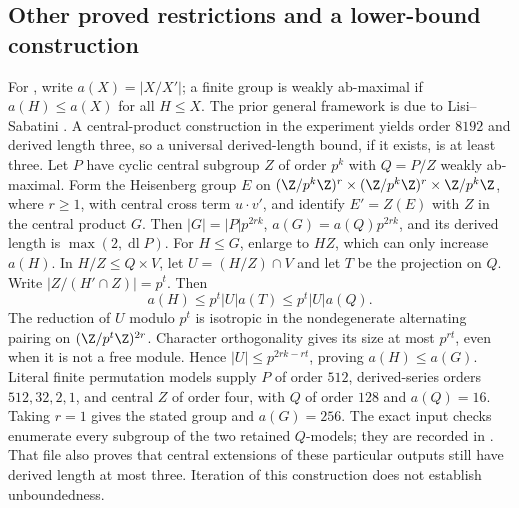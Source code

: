\subsection{Other proved restrictions and a lower-bound construction}

For , write \(a(X)=|X/X'|\); a finite group is
weakly ab-maximal if \(a(H)\le a(X)\) for all \(H\le X\).
The prior general framework is due to Lisi--Sabatini
\cite{lisi-sabatini}. A central-product construction in the
experiment yields order \(8192\) and derived length three,
so a universal derived-length bound, if it exists, is at least three.
Let \(P\) have cyclic central subgroup \(Z\) of order \(p^k\)
with \(Q=P/Z\) weakly ab-maximal. Form the Heisenberg group
\(E\) on \((\Z/p^k\Z)^r\times(\Z/p^k\Z)^r\times\Z/p^k\Z\),
where \(r\ge1\),
with central cross term \(u\cdot v'\), and identify \(E'=Z(E)\)
with \(Z\) in the central product \(G\).
Then \(|G|=|P|p^{2rk}\), \(a(G)=a(Q)p^{2rk}\), and its
derived length is \(\max(2,\operatorname{dl}P)\).
For \(H\le G\), enlarge to \(HZ\), which can only increase \(a(H)\).
In \(H/Z\le Q\times V\), let \(U=(H/Z)\cap V\) and let \(T\)
be the projection on \(Q\). Write
\(|Z/(H'\cap Z)|=p^t\). Then
\[
 a(H)\le p^t|U|a(T)\le p^t|U|a(Q).
\]
The reduction of \(U\) modulo \(p^t\) is isotropic in the
nondegenerate alternating pairing on
\((\Z/p^t\Z)^{2r}\). Character orthogonality gives its size
at most \(p^{rt}\), even when it is not a free module.
Hence \(|U|\le p^{2rk-rt}\), proving \(a(H)\le a(G)\).
Literal finite permutation models supply \(P\) of order \(512\),
derived-series orders \(512,32,2,1\), and central \(Z\) of order
four, with \(Q\) of order \(128\) and \(a(Q)=16\).
Taking \(r=1\) gives the stated group and \(a(G)=256\).
The exact input checks enumerate every subgroup of the two
retained \(Q\)-models; they are recorded in
.
That file also proves that central extensions of these particular
outputs still have derived length at most three. Iteration of
this construction does not establish unboundedness.

